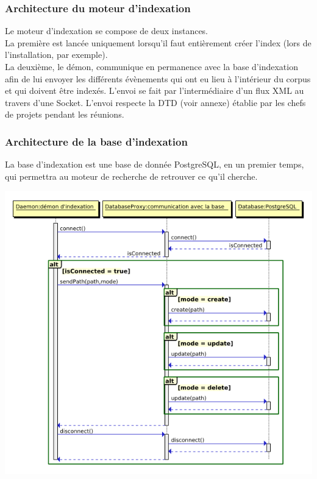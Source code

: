 \subsubsection{Architecture du moteur d'indexation}
Le moteur d'indexation se compose de deux instances.\\
La première est lancée uniquement lorsqu'il faut entièrement créer l'index (lors de l'installation, par exemple).\\
La deuxième, le démon, communique en permanence avec la base d'indexation afin de lui envoyer
les différents évènements qui ont eu lieu à l'intérieur du corpus et qui doivent être indexés.
L'envoi se fait par l'intermédiaire d'un flux XML au travers d'une Socket. L'envoi respecte la DTD (voir annexe)
établie par les chefs de projets pendant les réunions.

\subsubsection{Architecture de la base d'indexation}
La base d'indexation est une base de donnée PostgreSQL, en un premier temps, qui permettra au moteur de recherche 
de retrouver ce qu'il cherche.

\begin{center}
\includegraphics[scale=0.5]{seqdbi.png}
\end{center}

